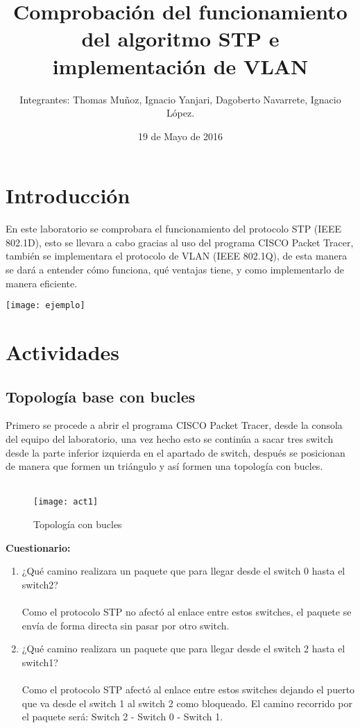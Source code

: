 \documentclass{udpreport}
\title{Comprobación del funcionamiento del algoritmo STP e implementación de VLAN}
\author{Integrantes: Thomas Muñoz, Ignacio Yanjari, Dagoberto Navarrete, Ignacio López.}
\date{19 de Mayo de 2016}
\begin{document}
\maketitle
\tableofcontents
\listoffigures
\chapter{Introducción}
  En este laboratorio se comprobara el funcionamiento del protocolo STP (IEEE 802.1D),  esto se llevara a cabo gracias al uso del programa CISCO Packet Tracer, también se implementara el protocolo de  VLAN (IEEE 802.1Q), de esta manera se dará a entender cómo funciona, qué  ventajas tiene, y como implementarlo de manera eficiente.
  
  \texttt{[image: ejemplo]}

  \vfill
  
\chapter{Actividades}
	\section{Topología base con bucles}
	Primero se procede a abrir el programa CISCO Packet Tracer, desde la consola del equipo del laboratorio, una vez hecho esto se
	continúa a sacar tres switch desde la parte inferior izquierda en el apartado de switch, después se posicionan de manera que
	formen un triángulo y así formen una topología con bucles.\\\\
	\begin{figure}[H]
    \centering
    \texttt{[image: act1]}
    \caption{Topología con bucles}
    \end{figure}
    
	{\large \bf{Cuestionario: }}\\
	\begin{enumerate}
	    \item ¿Qué camino realizara un paquete que para llegar desde el switch
                0 hasta el switch2?\\\\
                 Como el protocolo STP no afectó al enlace entre estos switches, el paquete se envía de forma directa sin pasar por otro switch.
    
        \item ¿Qué camino realizara un paquete que para llegar desde el switch
            2 hasta el switch1?\\\\
            Como el protocolo STP afectó al enlace entre estos switches dejando el puerto que va desde el switch 1 al switch 2 como bloqueado. El camino recorrido por el paquete será: Switch 2 - Switch 0 - Switch 1.\\\\\\\\\\\ 
	\end{enumerate}
\end{document}
